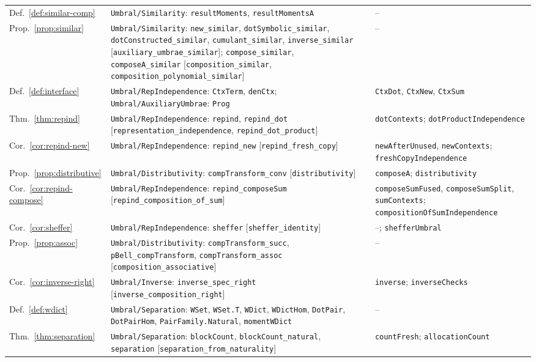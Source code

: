 \documentclass[11pt,a4paper]{report}
\theoremstyle{plain}
\theoremstyle{definition}
\theoremstyle{remark}
\begin{document}
{\begin{longtable}{@{}>{\raggedright\arraybackslash}p{2.4cm}>{\raggedright\arraybackslash}p{6.1cm}>{\raggedright\arraybackslash}p{4.9cm}@{}}
Def.~\ref{def:similar-comp} & \texttt{Umbral/Similarity}: \texttt{resultMoments}, \texttt{resultMomentsA} & -- \\
Prop.~\ref{prop:similar} & \texttt{Umbral/Similarity}: \texttt{new\_similar}, \texttt{dotSymbolic\_similar}, \texttt{dotConstructed\_similar}, \texttt{cumulant\_similar}, \texttt{inverse\_similar} [\texttt{auxiliary\_umbrae\_similar}]; \texttt{compose\_similar}, \texttt{composeA\_similar} [\texttt{composition\_similar}, \texttt{composition\_polynomial\_similar}] & -- \\
Def.~\ref{def:interface} & \texttt{Umbral/RepIndependence}: \texttt{CtxTerm}, \texttt{denCtx}; \texttt{Umbral/AuxiliaryUmbrae}: \texttt{Prog} & \texttt{CtxDot}, \texttt{CtxNew}, \texttt{CtxSum} \\
Thm.~\ref{thm:repind} & \texttt{Umbral/RepIndependence}: \texttt{repind}, \texttt{repind\_dot} [\texttt{representation\_independence}, \texttt{repind\_dot\_product}] & \texttt{dotContexts}; \texttt{dotProductIndependence} \\
Cor.~\ref{cor:repind-new} & \texttt{Umbral/RepIndependence}: \texttt{repind\_new} [\texttt{repind\_fresh\_copy}] & \texttt{newAfterUnused}, \texttt{newContexts}; \texttt{freshCopyIndependence} \\
Prop.~\ref{prop:distributive} & \texttt{Umbral/Distributivity}: \texttt{compTransform\_conv} [\texttt{distributivity}] & \texttt{composeA}; \texttt{distributivity} \\
Cor.~\ref{cor:repind-compose} & \texttt{Umbral/RepIndependence}: \texttt{repind\_composeSum} [\texttt{repind\_composition\_of\_sum}] & \texttt{composeSumFused}, \texttt{composeSumSplit}, \texttt{sumContexts}; \texttt{compositionOfSumIndependence} \\
Cor.~\ref{cor:sheffer} & \texttt{Umbral/RepIndependence}: \texttt{sheffer} [\texttt{sheffer\_identity}] & --; \texttt{shefferUmbral} \\
Prop.~\ref{prop:assoc} & \texttt{Umbral/Distributivity}: \texttt{compTransform\_succ}, \texttt{pBell\_compTransform}, \texttt{compTransform\_assoc} [\texttt{composition\_associative}] & -- \\
Cor.~\ref{cor:inverse-right} & \texttt{Umbral/Inverse}: \texttt{inverse\_spec\_right} [\texttt{inverse\_composition\_right}] & \texttt{inverse}; \texttt{inverseChecks} \\
Def.~\ref{def:wdict} & \texttt{Umbral/Separation}: \texttt{WSet}, \texttt{WSet.T}, \texttt{WDict}, \texttt{WDictHom}, \texttt{DotPair}, \texttt{DotPairHom}, \texttt{PairFamily.Natural}, \texttt{momentWDict} & -- \\
Thm.~\ref{thm:separation} & \texttt{Umbral/Separation}: \texttt{blockCount}, \texttt{blockCount\_natural}, \texttt{separation} [\texttt{separation\_from\_naturality}] & \texttt{countFresh}; \texttt{allocationCount} \\
\end{longtable}
}
\end{document}
